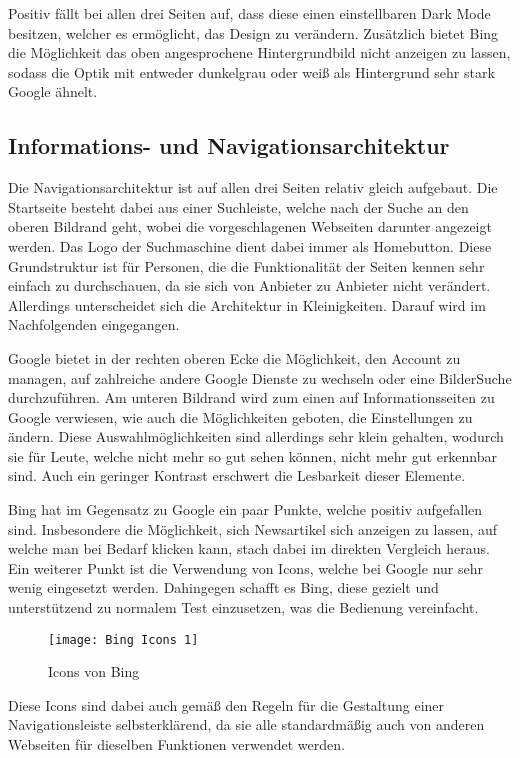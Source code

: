 Positiv fällt bei allen drei Seiten auf, dass diese einen einstellbaren Dark Mode besitzen, welcher es ermöglicht, das
Design zu verändern. Zusätzlich bietet Bing die Möglichkeit das oben angesprochene Hintergrundbild nicht anzeigen zu lassen,
sodass die Optik mit entweder dunkelgrau oder weiß als Hintergrund sehr stark Google ähnelt.

\subsection{Informations- und Navigationsarchitektur}
Die Navigationsarchitektur ist auf allen drei Seiten relativ gleich aufgebaut. Die Startseite besteht dabei aus einer
Suchleiste, welche nach der Suche an den oberen Bildrand geht, wobei die vorgeschlagenen Webseiten darunter angezeigt werden.
Das Logo der Suchmaschine dient dabei immer als Homebutton. Diese Grundstruktur ist für Personen, die die Funktionalität der
Seiten kennen sehr einfach zu durchschauen, da sie sich von Anbieter zu Anbieter nicht verändert. Allerdings unterscheidet
sich die Architektur in Kleinigkeiten. Darauf wird im Nachfolgenden eingegangen.

Google bietet in der rechten oberen Ecke die Möglichkeit, den Account zu managen, auf zahlreiche andere Google Dienste zu
wechseln oder eine Bilder\-Suche durchzuführen. Am unteren Bildrand wird zum einen auf Informationsseiten zu Google verwiesen,
wie auch die Möglichkeiten geboten, die Einstellungen zu ändern.
Diese Auswahlmöglichkeiten sind allerdings sehr klein gehalten,
wodurch sie für Leute, welche nicht mehr so gut sehen können, nicht mehr gut erkennbar sind. Auch ein geringer Kontrast
erschwert die Lesbarkeit dieser Elemente.

Bing hat im Gegensatz zu Google ein paar Punkte, welche positiv aufgefallen sind. Insbesondere die Möglichkeit, sich Newsartikel
sich anzeigen zu lassen, auf welche man bei Bedarf klicken kann, stach dabei im direkten Vergleich heraus. Ein weiterer Punkt
ist die Verwendung von Icons, welche bei Google nur sehr wenig eingesetzt werden. Dahingegen schafft es Bing, diese gezielt
und unterstützend zu normalem Test einzusetzen, was die Bedienung vereinfacht.
\begin{figure}[h]
    \centering
    \texttt{[image: Bing Icons 1]}
    \caption{Icons von Bing}
\end{figure}
Diese Icons sind dabei auch gemäß den Regeln
für die Gestaltung einer Navigationsleiste\autocite[Seite 17]{Maulhardt.20220621b} selbsterklärend, da sie alle standardmäßig auch von
anderen Webseiten für dieselben Funktionen verwendet werden.


